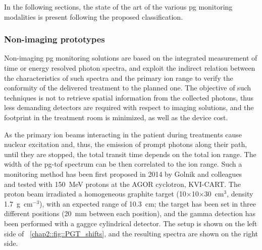 In the following sections, the state of the art of the various \gls{pg} monitoring modalities is present following the proposed classification.

\subsubsection{Non-imaging prototypes}\label{chap2::subsec::PGdevices_nonImaging}

Non-imaging \gls{pg} monitoring solutions are based on the integrated measurement of time or energy resolved photon spectra, and exploit the indirect relation between the characteristics of such spectra and the primary ion range to verify the conformity of the delivered treatment to the planned one. The objective of such techniques is not to retrieve spatial information from the collected photons, thus less demanding detectors are required with respect to imaging solutions, and the footprint in the treatment room is minimized, as well as the device cost. 

As the primary ion beams interacting in the patient during treatments  cause nuclear excitation and, thus, the emission of prompt photons along their path, until they are stopped, the total transit time depends on the total ion range. The width of the \gls{pg}-\gls{tof} spectrum can be then correlated to the ion range. Such a monitoring method has been first proposed in 2014 by Golnik and colleagues~\parencite{Golnik2014} and tested with 150~MeV protons at the AGOR cyclotron, KVI-CART. The proton beam irradiated a homogeneous graphite target (10$\times$10$\times$30~cm$^3$, density 1.7~g~cm$^{-3}$), with an expected range of 10.3~cm; the target has been set in three different positions (20~mm between each position), and the gamma detection has been performed with a \gls{gaggce} cylindrical detector.  The setup is shown on the left side of \figurename~\ref{chap2::fig::PGT_shifts}, and the resulting spectra are shown  on the right side.


